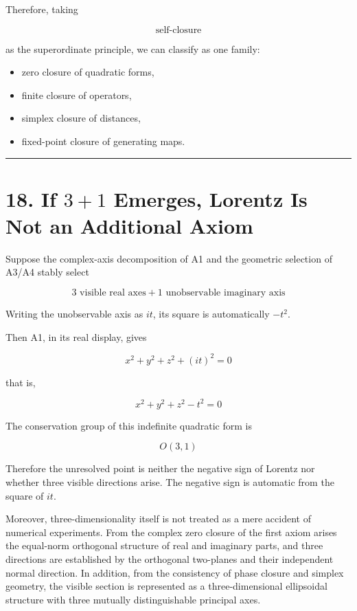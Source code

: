 \documentclass[
  a4paper,
]{article}
\providecommand{\tightlist}{%
  \setlength{\itemsep}{0pt}\setlength{\parskip}{0pt}}
\begin{document}
Therefore, taking

\[
\boxed{
\text{self-closure}
}
\]

as the superordinate principle, we can classify as one family:

\begin{itemize}
\tightlist
\item
  zero closure of quadratic forms,
\item
  finite closure of operators,
\item
  simplex closure of distances,
\item
  fixed-point closure of generating maps.
\end{itemize}

\begin{center}\rule{0.5\linewidth}{0.5pt}\end{center}

\section{\texorpdfstring{18. If \(3+1\) Emerges, Lorentz Is Not an
Additional
Axiom}{18. If 3+1 Emerges, Lorentz Is Not an Additional Axiom}}\label{if-31-emerges-lorentz-is-not-an-additional-axiom}

Suppose the complex-axis decomposition of A1 and the geometric selection
of A3/A4 stably select

\[
\boxed{
3\text{ visible real axes}
+
1\text{ unobservable imaginary axis}
}
\]

Writing the unobservable axis as \(it\), its square is automatically
\(-t^2\).

Then A1, in its real display, gives

\[
x^2+y^2+z^2+(it)^2=0
\]

that is,

\[
\boxed{x^2+y^2+z^2-t^2=0}
\]

The conservation group of this indefinite quadratic form is

\[
O(3,1)
\]

Therefore the unresolved point is neither the negative sign of Lorentz
nor whether three visible directions arise. The negative sign is
automatic from the square of \(it\).

Moreover, three-dimensionality itself is not treated as a mere accident
of numerical experiments. From the complex zero closure of the first
axiom arises the equal-norm orthogonal structure of real and imaginary
parts, and three directions are established by the orthogonal two-planes
and their independent normal direction. In addition, from the
consistency of phase closure and simplex geometry, the visible section
is represented as a three-dimensional ellipsoidal structure with three
mutually distinguishable principal axes.
\end{document}
